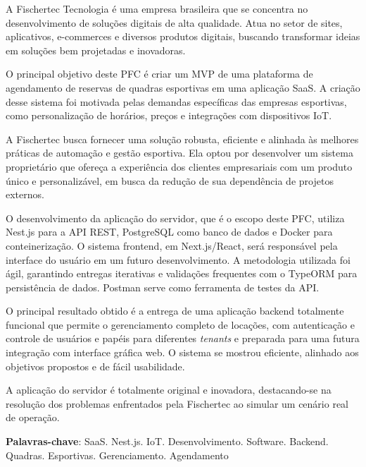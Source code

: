 \begin{resumo}
	\SingleSpacing
	A Fischertec Tecnologia é uma empresa brasileira que se concentra no desenvolvimento de soluções digitais de alta qualidade. Atua no setor de sites, aplicativos, e-commerces e diversos produtos digitais, buscando transformar ideias em soluções bem projetadas e inovadoras.

	O principal objetivo deste PFC é criar um \acrfull{MVP} de uma plataforma de agendamento de reservas de quadras esportivas em uma aplicação \acrfull{SaaS}. A criação desse sistema foi motivada pelas demandas específicas das empresas esportivas, como personalização de horários, preços e integrações com dispositivos \acrfull{IoT}.

	A Fischertec busca fornecer uma solução robusta, eficiente e alinhada às melhores práticas de automação e gestão esportiva. Ela optou por desenvolver um sistema proprietário que ofereça a experiência dos clientes empresariais com um produto único e personalizável, em busca da redução de sua dependência de projetos externos.

	O desenvolvimento da aplicação do servidor, que é o escopo deste PFC, utiliza Nest.js para a \acrshort{API} \acrshort{REST}, PostgreSQL como banco de dados e Docker para conteinerização. O sistema frontend, em Next.js/React, será responsável pela interface do usuário em um futuro desenvolvimento. A metodologia utilizada foi ágil, garantindo entregas iterativas e validações frequentes com o TypeORM para persistência de dados. Postman serve como ferramenta de testes da \acrshort{API}.

	O principal resultado obtido é a entrega de uma aplicação backend totalmente funcional que permite o gerenciamento completo de locações, com autenticação e controle de usuários e papéis para diferentes \textit{tenants} e preparada para uma futura integração com interface gráfica web. O sistema se mostrou eficiente, alinhado aos objetivos propostos e de fácil usabilidade.

	A aplicação do servidor é totalmente original e inovadora, destacando-se na resolução dos problemas enfrentados pela Fischertec ao simular um cenário real de operação.

	\textbf{Palavras-chave}: \acrshort{SaaS}. Nest.js. \acrshort{IoT}. Desenvolvimento. Software. Backend. Quadras. Esportivas. Gerenciamento. Agendamento
\end{resumo}

		
